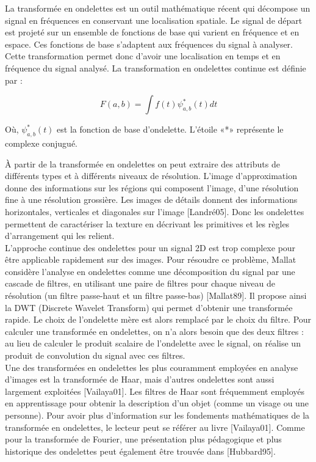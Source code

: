 La transformée en ondelettes est un outil mathématique récent qui décompose un signal en fréquences en conservant une localisation spatiale. Le signal de départ est projeté sur un ensemble de fonctions de base qui varient en fréquence et en espace. Ces fonctions de base s’adaptent aux fréquences du signal à analyser. Cette transformation permet donc d’avoir une localisation en temps et en fréquence du signal analysé. La transformation en ondelettes continue est définie par :

\begin{equation}
	 F(a,b) = {\int }f\left(t\right) \psi_{a,b}^*(t) dt  
\end{equation}

Où, $ \psi_{a,b}^*(t) $ est la fonction de base d’ondelette. L’étoile «*» représente le complexe conjugué.

À partir de la transformée en ondelettes on peut extraire des attributs de différents types et à différents niveaux de résolution. L'image d'approximation donne des informations sur les régions qui composent l'image, d'une résolution fine à une résolution grossière. Les images de
détails donnent des informations horizontales, verticales et diagonales sur l'image [Landré05]. Donc les ondelettes permettent de caractériser la texture en décrivant les primitives et les règles d'arrangement qui les relient.\\

L’approche continue des ondelettes pour un signal 2D est trop complexe pour être applicable
rapidement sur des images. Pour résoudre ce problème, Mallat considère l'analyse en ondelettes comme une décomposition du signal par une cascade de filtres, en utilisant une
paire de filtres pour chaque niveau de résolution (un filtre passe-haut et un filtre passe-bas) [Mallat89]. Il propose ainsi la DWT (Discrete Wavelet Transform) qui permet d'obtenir une transformée rapide. Le choix de l'ondelette mère est alors remplacé par le choix du filtre. Pour calculer une transformée en ondelettes, on n'a alors besoin que des deux filtres : au lieu de calculer le produit scalaire de l'ondelette avec le signal, on réalise un produit de convolution du signal avec ces filtres.\\

Une des transformées en ondelettes les plus couramment employées en analyse d'images est la
transformée de Haar, mais d'autres ondelettes sont aussi largement exploitées [Vailaya01]. Les filtres de Haar sont fréquemment employés en apprentissage pour obtenir la description d'un objet (comme un visage ou une personne). Pour avoir plus d'information sur les fondements mathématiques de la transformée en ondelettes, le lecteur peut se référer au livre [Vailaya01]. Comme pour la transformée de Fourier, une présentation plus pédagogique et plus historique des ondelettes peut également être trouvée
dans [Hubbard95].

